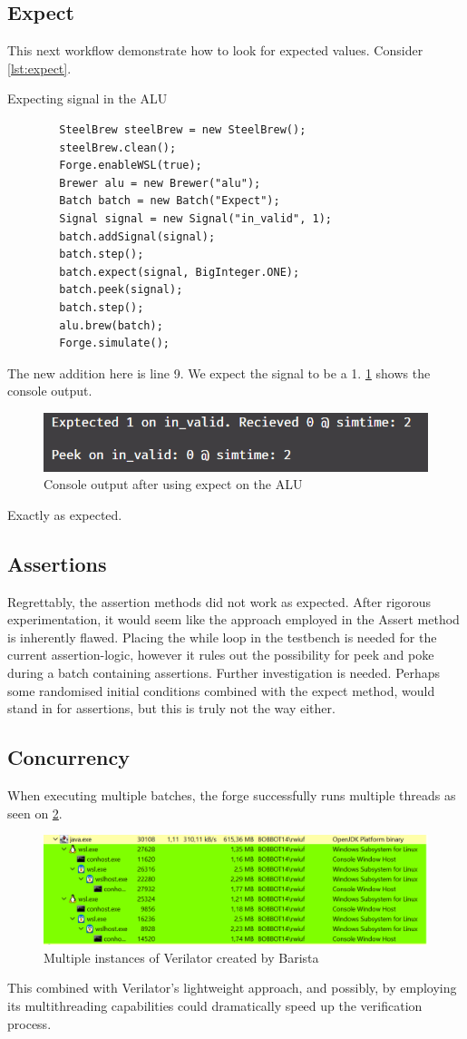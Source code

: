 \subsection{Expect}
This next workflow demonstrate how to look for expected values. Consider \cref{lst:expect}.
\begin{listing}
    \centering
    \caption{Expecting signal in the ALU}\label{lst:expect}
    \begin{verbatim}
        SteelBrew steelBrew = new SteelBrew();
        steelBrew.clean();
        Forge.enableWSL(true);
        Brewer alu = new Brewer("alu");
        Batch batch = new Batch("Expect");
        Signal signal = new Signal("in_valid", 1);
        batch.addSignal(signal);
        batch.step();
        batch.expect(signal, BigInteger.ONE);
        batch.peek(signal);
        batch.step();
        alu.brew(batch);
        Forge.simulate();
    \end{verbatim}
\end{listing}
The new addition here is line 9. We expect the signal to be a 1. \cref{fig:expectConsole} shows the console output.
\begin{figure}
    \centering
    \caption{Console output after using expect on the ALU}\label{fig:expectConsole}
    \includegraphics[width=.5\textwidth]{graphics/expectConsole.png}
\end{figure}
Exactly as expected.
\subsection{Assertions}
Regrettably, the assertion methods did not work as expected. After rigorous experimentation, it would seem like the approach employed in the Assert method is inherently flawed. Placing the while loop in the testbench is needed for the current assertion-logic, however it rules out the possibility for peek and poke during a batch containing assertions. Further investigation is needed. Perhaps some randomised initial conditions combined with the expect method, would stand in for assertions, but this is truly not the way either.
\subsection{Concurrency}
When executing multiple batches, the forge successfully runs multiple threads as seen on \cref{fig:concurr}.
\begin{figure}
    \centering
    \caption{Multiple instances of Verilator created by Barista}\label{fig:concurr}
    \includegraphics[width=.8\textwidth]{graphics/concurrency.png}
\end{figure}
This combined with Verilator's lightweight approach, and possibly, by employing its multithreading capabilities could dramatically speed up the verification process.
